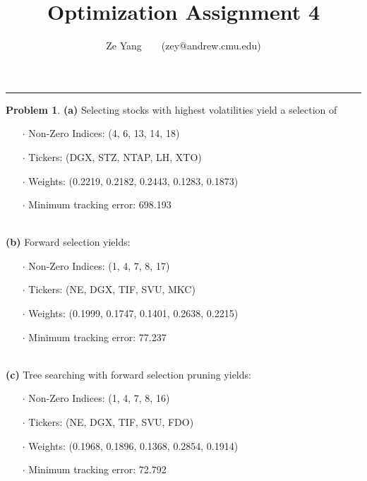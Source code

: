 \documentclass[a4paper, 8pt]{article}
\title{\textbf{Optimization Assignment 4}}
\author{Ze Yang~~~~(zey@andrew.cmu.edu)}
\theoremstyle{definition}
\newtheorem{problem}{Problem}
\theoremstyle{hSol}
\begin{document}
\maketitle

\noindent\rule{16cm}{0.4pt}
\begin{problem} \textbf{(a)} Selecting stocks with highest volatilities yield a selection of 
\begin{itemize}
	\item[$\cdot$] Non-Zero Indices: (4, 6, 13, 14, 18)
	\item[$\cdot$] Tickers: (DGX, STZ, NTAP, LH, XTO)
	\item[$\cdot$] Weights: (0.2219, 0.2182, 0.2443, 0.1283, 0.1873)
	\item[$\cdot$] Minimum tracking error: 698.193
\end{itemize}
~\\
\textbf{(b)} Forward selection yields:
\begin{itemize}
	\item[$\cdot$] Non-Zero Indices: (1, 4, 7, 8, 17)
	\item[$\cdot$] Tickers: (NE, DGX, TIF, SVU, MKC)
	\item[$\cdot$] Weights: (0.1999, 0.1747, 0.1401, 0.2638, 0.2215)
	\item[$\cdot$] Minimum tracking error: 77.237
\end{itemize}
~\\
\textbf{(c)} Tree searching with forward selection pruning yields:
\begin{itemize}
	\item[$\cdot$] Non-Zero Indices: (1, 4, 7, 8, 16)
	\item[$\cdot$] Tickers: (NE, DGX, TIF, SVU, FDO)
	\item[$\cdot$] Weights: (0.1968, 0.1896, 0.1368, 0.2854, 0.1914)
	\item[$\cdot$] Minimum tracking error: 72.792
\end{itemize}
\end{problem}
\end{document}
